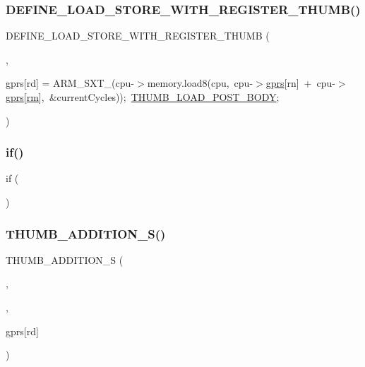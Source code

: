 \subsubsection{\texorpdfstring{D\+E\+F\+I\+N\+E\+\_\+\+L\+O\+A\+D\+\_\+\+S\+T\+O\+R\+E\+\_\+\+W\+I\+T\+H\+\_\+\+R\+E\+G\+I\+S\+T\+E\+R\+\_\+\+T\+H\+U\+M\+B()}{DEFINE\_LOAD\_STORE\_WITH\_REGISTER\_THUMB()}}
{\footnotesize\ttfamily D\+E\+F\+I\+N\+E\+\_\+\+L\+O\+A\+D\+\_\+\+S\+T\+O\+R\+E\+\_\+\+W\+I\+T\+H\+\_\+\+R\+E\+G\+I\+S\+T\+E\+R\+\_\+\+T\+H\+U\+MB (\begin{DoxyParamCaption}\item[{L\+D\+R\+SB}]{,  }\item[{cpu-\/$>$}]{gprs\mbox{[}rd\mbox{]} = {\ttfamily ARM\+\_\+SXT\+\_(cpu-\/$>$memory.load8(cpu,~cpu-\/$>$\mbox{\hyperlink{isa-thumb_8c_a6b4b7e13a9a144391615b217c5917bc7}{gprs}}\mbox{[}rn\mbox{]}~+~cpu-\/$>$\mbox{\hyperlink{isa-thumb_8c_a6b4b7e13a9a144391615b217c5917bc7}{gprs}}\mbox{[}\mbox{\hyperlink{isa-thumb_8c_a20e40d2fb8c51fa4dd2b4449ad32e111}{rm}}\mbox{]},~\&currentCycles));~\mbox{\hyperlink{isa-thumb_8c_a9438645a9cdcda0203c3769a4658e9b1}{T\+H\+U\+M\+B\+\_\+\+L\+O\+A\+D\+\_\+\+P\+O\+S\+T\+\_\+\+B\+O\+DY}};} }\end{DoxyParamCaption})}

\mbox{\label{isa-thumb_8c_a2f69e657aa117d0aa42eec581e69a059}} 
\subsubsection{\texorpdfstring{if()}{if()}}
{\footnotesize\ttfamily if (\begin{DoxyParamCaption}\item[{\mbox{\hyperlink{isa-thumb_8c_a03b78d51ad860bbea2f9c98276d0b70b}{rs}}}]{ }\end{DoxyParamCaption})}

\mbox{\label{isa-thumb_8c_a033bc2698df421a3e3f85f4f8211a20f}} 
\subsubsection{\texorpdfstring{T\+H\+U\+M\+B\+\_\+\+A\+D\+D\+I\+T\+I\+O\+N\+\_\+\+S()}{THUMB\_ADDITION\_S()}}
{\footnotesize\ttfamily T\+H\+U\+M\+B\+\_\+\+A\+D\+D\+I\+T\+I\+O\+N\+\_\+S (\begin{DoxyParamCaption}\item[{\mbox{\hyperlink{isa-thumb_8c_a6f364afbe132c4ecfea48bde1b0618ba}{d}}}]{,  }\item[{\mbox{\hyperlink{isa-lr35902_8c_ae54e54065504090672c92ef62a1c5f05}{n}}}]{,  }\item[{cpu-\/$>$}]{gprs\mbox{[}rd\mbox{]} }\end{DoxyParamCaption})}

